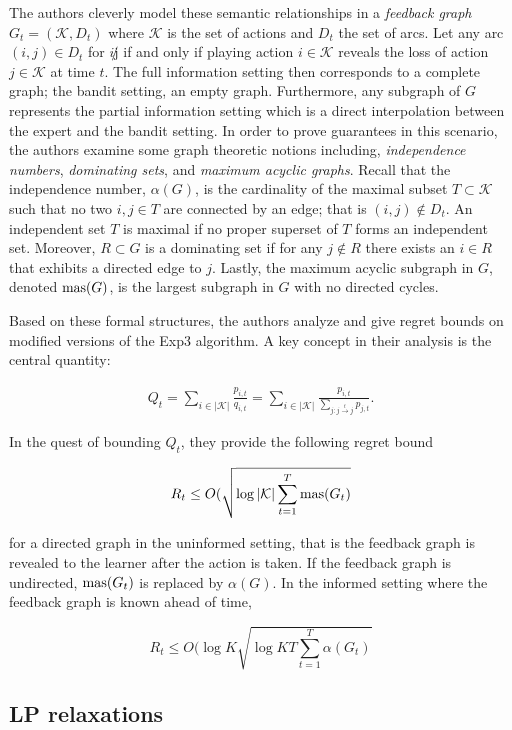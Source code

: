 The authors cleverly model these semantic relationships in a \textit{feedback graph} $G_t=(\mathcal{K},D_t)$ where $\mathcal{K}$ is the set of actions and $D_t$ the set of arcs. Let any arc $(i,j)\in D_t$ for $i\not j$ if and only if playing action $i\in\mathcal{K}$ reveals the loss of action $j\in \mathcal{K}$ at time $t$. The full information setting then corresponds to a complete graph; the bandit setting, an empty graph. Furthermore, any subgraph of $G$ represents the partial information setting which is a direct interpolation between the expert and the bandit setting. In order to prove guarantees in this scenario, the authors examine some graph theoretic notions including, \textit{independence numbers}, \textit{dominating sets}, and \textit{maximum acyclic graphs}. Recall that the independence number, $\alpha(G)$, is the cardinality of the maximal subset $T\subset \mathcal{K}$ such that no two $i,j\in T$ are connected by an edge; that is $(i,j)\not\in D_t$. An independent set $T$ is maximal if no proper superset of $T$ forms an independent set. Moreover, $R\subset G$ is a dominating set if for any $j\not\in R$ there exists an $i\in R$ that exhibits a directed edge to $j$. Lastly, the maximum acyclic subgraph in $G$, denoted $\text{mas}(G)$, is the largest subgraph in $G$ with no directed cycles. 

Based on these formal structures, the authors analyze and give regret bounds on modified versions of the Exp3 algorithm. A key concept in their analysis is the central quantity:

\begin{align}
	Q_t=\sum_{i\in |\mathcal{K}|}\frac{p_{i,t}}{q_{i,t}} = \sum_{i\in |\mathcal{K}|}\frac{p_{i,t}}{\sum_{j:j\overset{t}{\to}j} p_{j,t}}.
\end{align}

In the quest of bounding $Q_t$, they provide the following regret bound

$$R_t\leq O(\sqrt{\log |\mathcal{K}|\sum_{t=1}^T\text{mas}(G_t)}$$

for a directed graph in the uninformed setting, that is the feedback graph is revealed to the learner after the action is taken. If the feedback graph is undirected, $\text{mas}(G_t)$ is replaced by $\alpha(G)$. In the informed setting where the feedback graph is known ahead of time, 

$$R_t \leq O(\log K\sqrt{\log KT\sum_{t=1}^T\alpha(G_t)}$$

\subsection{LP relaxations}

